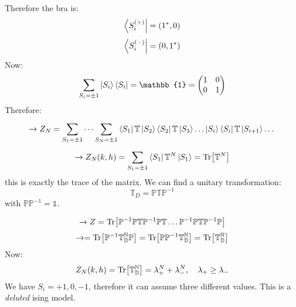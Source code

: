 \documentclass[../main/main.tex]{subfiles}
\begin{document}
Therefore the bra is:
\begin{equation}
  \bra{S_i^{(+)}} = (1^*,0)
\end{equation}
\begin{equation}
  \bra{S_i^{(-)}} = (0,1^*)
\end{equation}
Now:
\begin{equation}
  \sum_{S_i = \pm 1}^{}  \ket{S_i} \bra{S_i} = \mathbb{1} = \begin{pmatrix}
  1   & 0 \\
  0   & 1
  \end{pmatrix}
\end{equation}
Therefore:
\begin{equation}
  \rightarrow Z_N = \sum_{S_1 = \pm 1}^{} \dots \sum_{S_N = \pm 1}^{} \bra{S_1} \mathbb{T} \ket{S_2} \bra{S_2}  \mathbb{T} \ket{S_3} \dots \ket{S_i} \bra{S_i}  \mathbb{T} \ket{S_{i+1}} \dots
\end{equation}
\begin{equation}
  \rightarrow Z_N(k,h) = \sum_{S_1 = \pm 1}^{}  \bra{S_1}  \mathbb{T}^N \ket{S_1} = \Tr[\mathbb{T}^N]
\end{equation}
this is exactly the trace of the matrix.
We can find a unitary transformation:
\begin{equation}
   \mathbb{T}_D = \mathbb{P} \mathbb{T} \mathbb{P}^{-1}
\end{equation}
with \( \mathbb{P} \mathbb{P}^{-1} = \mathbb{1} \).

\begin{equation}
  \rightarrow Z = \Tr [ \mathbb{P}^{-1} \mathbb{P} \mathbb{T}  \mathbb{P}^{-1} \mathbb{P} \mathbb{T}  \dots \mathbb{P}^{-1} \mathbb{P} \mathbb{T} \mathbb{P}^{-1} \mathbb{P} ]
\end{equation}
\begin{equation}
  \rightarrow  = \Tr[ \mathbb{P}^{-1}  \mathbb{T_D^N} \mathbb{P}] = \Tr[ \mathbb{P} \mathbb{P}^{-1} \mathbb{T_D^N} ] = \Tr[\mathbb{T_D^N}]
\end{equation}
Now:
\begin{equation}
  Z_N (k,h) = \Tr[\mathbb{T_D^N}] = \lambda _+^N  + \lambda _-^N, \quad \lambda _+ \ge \lambda_-
\end{equation}
We have \( S_i = +1,0,-1 \), therefore it can assume three different values.
This is a \emph{deluted} ising model.
\end{document}
